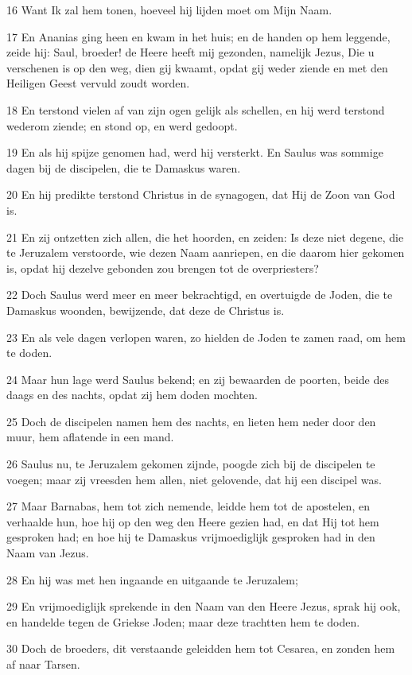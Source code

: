 \par 16 Want Ik zal hem tonen, hoeveel hij lijden moet om Mijn Naam.
\par 17 En Ananias ging heen en kwam in het huis; en de handen op hem leggende, zeide hij: Saul, broeder! de Heere heeft mij gezonden, namelijk Jezus, Die u verschenen is op den weg, dien gij kwaamt, opdat gij weder ziende en met den Heiligen Geest vervuld zoudt worden.
\par 18 En terstond vielen af van zijn ogen gelijk als schellen, en hij werd terstond wederom ziende; en stond op, en werd gedoopt.
\par 19 En als hij spijze genomen had, werd hij versterkt. En Saulus was sommige dagen bij de discipelen, die te Damaskus waren.
\par 20 En hij predikte terstond Christus in de synagogen, dat Hij de Zoon van God is.
\par 21 En zij ontzetten zich allen, die het hoorden, en zeiden: Is deze niet degene, die te Jeruzalem verstoorde, wie dezen Naam aanriepen, en die daarom hier gekomen is, opdat hij dezelve gebonden zou brengen tot de overpriesters?
\par 22 Doch Saulus werd meer en meer bekrachtigd, en overtuigde de Joden, die te Damaskus woonden, bewijzende, dat deze de Christus is.
\par 23 En als vele dagen verlopen waren, zo hielden de Joden te zamen raad, om hem te doden.
\par 24 Maar hun lage werd Saulus bekend; en zij bewaarden de poorten, beide des daags en des nachts, opdat zij hem doden mochten.
\par 25 Doch de discipelen namen hem des nachts, en lieten hem neder door den muur, hem aflatende in een mand.
\par 26 Saulus nu, te Jeruzalem gekomen zijnde, poogde zich bij de discipelen te voegen; maar zij vreesden hem allen, niet gelovende, dat hij een discipel was.
\par 27 Maar Barnabas, hem tot zich nemende, leidde hem tot de apostelen, en verhaalde hun, hoe hij op den weg den Heere gezien had, en dat Hij tot hem gesproken had; en hoe hij te Damaskus vrijmoediglijk gesproken had in den Naam van Jezus.
\par 28 En hij was met hen ingaande en uitgaande te Jeruzalem;
\par 29 En vrijmoediglijk sprekende in den Naam van den Heere Jezus, sprak hij ook, en handelde tegen de Griekse Joden; maar deze trachtten hem te doden.
\par 30 Doch de broeders, dit verstaande geleidden hem tot Cesarea, en zonden hem af naar Tarsen.
